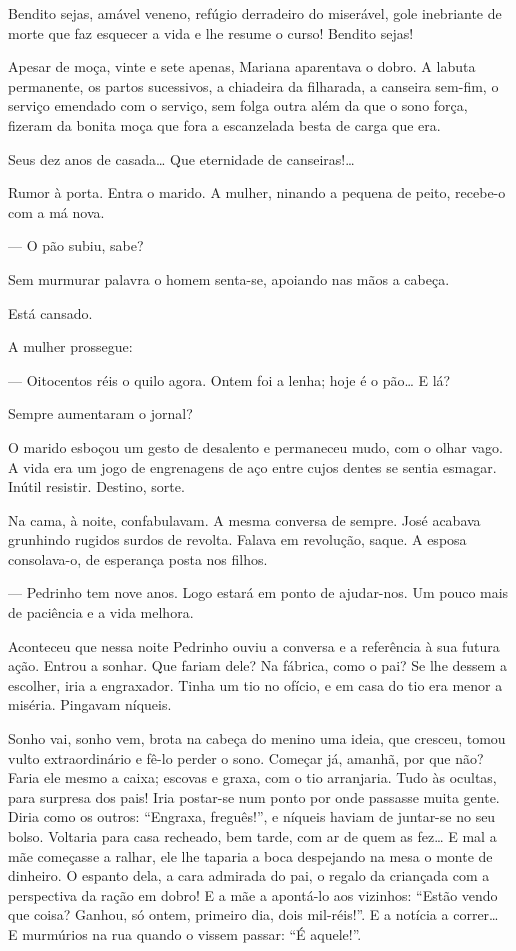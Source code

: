 Bendito sejas, amável veneno, refúgio derradeiro do miserável, gole
inebriante de morte que faz esquecer a vida e lhe resume o curso!
Bendito sejas!

Apesar de moça, vinte e sete apenas, Mariana aparentava o dobro. A
labuta permanente, os partos sucessivos, a chiadeira da filharada, a
canseira sem-fim, o serviço emendado com o serviço, sem folga outra além
da que o sono força, fizeram da bonita moça que fora a escanzelada besta
de carga que era.

Seus dez anos de casada\ldots{} Que eternidade de canseiras!\ldots{}

Rumor à porta. Entra o marido. A mulher, ninando a pequena de peito,
recebe-o com a má nova.

--- O pão subiu, sabe?

Sem murmurar palavra o homem senta-se, apoiando nas mãos a cabeça.

Está cansado.

A mulher prossegue:

--- Oitocentos réis o quilo agora. Ontem foi a lenha; hoje é o pão\ldots{} E
lá?

Sempre aumentaram o jornal?

O marido esboçou um gesto de desalento e permaneceu mudo, com o olhar
vago. A vida era um jogo de engrenagens de aço entre cujos dentes se
sentia esmagar. Inútil resistir. Destino, sorte.

Na cama, à noite, confabulavam. A mesma conversa de sempre. José acabava
grunhindo rugidos surdos de revolta. Falava em revolução, saque. A
esposa consolava-o, de esperança posta nos filhos.

--- Pedrinho tem nove anos. Logo estará em ponto de ajudar-nos. Um pouco
mais de paciência e a vida melhora.

Aconteceu que nessa noite Pedrinho ouviu a conversa e a referência à sua
futura ação. Entrou a sonhar. Que fariam dele? Na fábrica, como o pai?
Se lhe dessem a escolher, iria a engraxador. Tinha um tio no ofício, e
em casa do tio era menor a miséria. Pingavam níqueis.

Sonho vai, sonho vem, brota na cabeça do menino uma ideia, que cresceu,
tomou vulto extraordinário e fê-lo perder o sono. Começar já, amanhã,
por que não? Faria ele mesmo a caixa; escovas e graxa, com o tio
arranjaria. Tudo às ocultas, para surpresa dos pais! Iria postar-se num
ponto por onde passasse muita gente. Diria como os outros: ``Engraxa,
freguês!'', e níqueis haviam de juntar-se no seu bolso. Voltaria para
casa recheado, bem tarde, com ar de quem as fez\ldots{} E mal a mãe começasse
a ralhar, ele lhe taparia a boca despejando na mesa o monte de dinheiro.
O espanto dela, a cara admirada do pai, o regalo da criançada com a
perspectiva da ração em dobro! E a mãe a apontá-lo aos vizinhos: ``Estão
vendo que coisa? Ganhou, só ontem, primeiro dia, dois mil-réis!''. E a
notícia a correr\ldots{} E murmúrios na rua quando o vissem passar: ``É
aquele!''.

